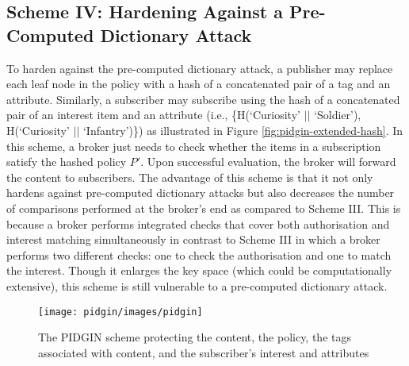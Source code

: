 \documentclass[epsfig,a4paper,11pt,titlepage]{book}
\numberwithin{algorithm}{chapter}
\begin{document}
\subsection{Scheme IV: Hardening Against a Pre-Computed Dictionary Attack}
To harden against the pre-computed dictionary attack, a publisher may replace each leaf node in the policy with a hash of a concatenated pair of a tag and an attribute. Similarly, a subscriber may subscribe using the hash of a concatenated pair of an interest item and an attribute (i.e., \{H(`Curiosity' $||$ `Soldier'), H(`Curiosity' $||$ `Infantry')\}) as illustrated in Figure \ref{fig:pidgin-extended-hash}. In this scheme, a broker just needs to check whether the items in a subscription satisfy the hashed policy $P'$. Upon successful evaluation, the broker will forward the content to subscribers. The advantage of this scheme is that it not only hardens against pre-computed dictionary attacks but also decreases the number of comparisons performed at the broker's end as compared to Scheme III. This is because a broker performs integrated checks that cover both authorisation and interest matching simultaneously in contrast to Scheme III in which a broker performs two different checks: one to check the authorisation and one to match the interest. Though it enlarges the key space (which could be computationally extensive), this scheme is still vulnerable to a pre-computed dictionary attack.

\begin{figure} [htp]
\centering
\texttt{[image: pidgin/images/pidgin]}
\caption[The PIDGIN scheme protecting the content and policies]{The \gls{PIDGIN} scheme protecting the content, the policy, the tags associated with content, and the subscriber's interest and attributes}
\label{fig:pidgin-pidgin}
\end{figure}
\end{document}
